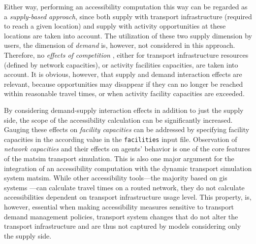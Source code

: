 Either way, performing an accessibility computation this way can be regarded as a \emph{supply-based approach}, 
since both supply with transport infrastructure (required to reach a given location) and supply with 
activity opportunities at these locations are taken into account. The utilization of these two supply dimension by users, 
\ie the dimension of \emph{demand} is, however, not considered in this approach. Therefore, no 
\emph{effects of competition} \citep{Geurs2004AccessibilityReview}, either for transport infrastructure resources 
(defined by network capacities), or activity facilities capacities, are taken into account. It is 
obvious, however, that supply and demand interaction effects are relevant, because opportunities may disappear 
if they can no longer be reached within reasonable travel times, or when activity facility capacities 
are exceeded. 

By considering demand-supply interaction effects in addition to just the
supply side, the scope of the accessibility calculation can be significantly increased.
Gauging these effects on \emph{facility capacities} can be addressed by specifying facility
capacities in the according value in the \lstinline{facilities} input file. 
Observation of
\emph{network capacities} and their effects on agents' behavior
is one of the core features
of the \gls{matsim} transport simulation. This is also one major argument for the integration of an accessibility
computation with the dynamic transport simulation system \gls{matsim}. While other accessibility tools---the
majority based on \gls{gis} systems
\citep{BBSRErreichbarkeitsmodell, CurtisEtAl2013AccessibilityPolicyInnovation, BuettnerEtAl2010Erreichbarkeitsatlas, LiuZhu2004AccessibilityAnalyst, GulhanEtAl2014PotentialAccessibilityMeasureDenizli}---can calculate travel times on a routed network, they do not calculate accessibilities dependent on transport infrastructure usage
level. This property, is, however, essential when making accessibility measures sensitive to
transport demand management policies, \ie transport system changes that do not alter the transport
infrastructure and are thus not captured by models considering only the supply side.


